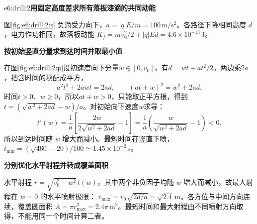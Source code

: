 \begin{drillsolution}{e6:drill:2}\textbf{用固定高度差求所有落板漆滴的共同动能}\par\nobreak
图\ref{fig:e6:drill:2:s} 负滴受力向下，$a=|q|E/m=100\,\mathrm{m/s^2}$。各路径下降相同高度 $d$，电力作功相同，故落板动能
$K_f=mv_0^2/2+|q|Ed=4.6\times10^{-13}\,\mathrm J$。



\par\medskip{}\noindent\textbf{按初始竖直分量求到达时间并取最小值}\par\nobreak
在图\ref{fig:e6:drill:2:p}设初速度向下分量$w\in[0,v_0]$，有$d=wt+at^2/2$。两边乘$2a$，把含时间的项配成平方，
\[
a^2t^2+2awt=2ad,\qquad (at+w)^2=w^2+2ad.
\]
时间$t>0$、$w\ge0$，所以$at+w>0$，只能取正平方根，得到$t=(\sqrt{w^2+2ad}-w)/a$。对初始向下速度$w$求导：
\[
t'(w)=\frac1a\left[\frac{2w}{2\sqrt{w^2+2ad}}-1\right]
=\frac1a\left(\frac{w}{\sqrt{w^2+2ad}}-1\right)<0.
\]
所以到达时间随 $w$ 增大而减小。最短时间在竖直下喷，
$t_{\min}=(\sqrt{460}-20)/100\simeq1.45\times10^{-2}\,\mathrm s$。



\par\medskip{}\noindent\textbf{分别优化水平射程并转成覆盖面积}\par\nobreak
水平射程 $r=\sqrt{v_0^2-w^2}\,t(w)$，其中两个非负因子均随 $w$ 增大而减小，故最大射程在 $w=0$ 的水平喷射极限：
$r_{\max}=v_0\sqrt{2d/a}=\sqrt{2.4}\,\mathrm m$。各方位与中间方向连续，覆盖圆面积 $A=\pi r_{\max}^2=2.4\pi\,\mathrm m^2$。最短时间和最大射程由不同喷射方向取得，不能用同一个时间计算二者。\end{drillsolution}
